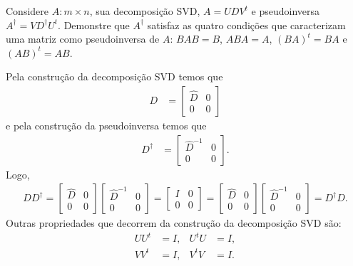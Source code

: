 \documentclass[a4paper,12pt, leqno, answers]{exam}
\begin{document}
\thispagestyle{empty}

\newpage
\setcounter{page}{1}
\begin{questions}
    \question Considere $A : m \times n$, sua decomposi\c{c}\~{a}o SVD, $A = U D V^t$ e pseudoinversa $A^\dagger = V D^\dagger U^t$. Demonstre que $A^\dagger$ satisfaz as quatro condi\c{c}\~{o}es que caracterizam uma matriz como pseudoinversa de $A$: $B A B = B$, $A B A = A$, $(B A)^t = BA$ e $(A B)^t = A B$.
    \begin{solution}
        Pela constru\c{c}\~{a}o da decomposi\c{c}\~{a}o SVD temos que
        \begin{align*}
            D &= \begin{bmatrix}
                \hat{D} & 0 \\
                0 & 0
            \end{bmatrix}
        \end{align*}
        e pela constru\c{c}\~{a}o da pseudoinversa temos que
        \begin{align*}
            D^\dagger &= \begin{bmatrix}
                \hat{D}^{-1} & 0 \\
                0 & 0
            \end{bmatrix}.
        \end{align*}
        Logo,
        \begin{align*}
            D D^\dagger = \begin{bmatrix}
                \hat{D} & 0 \\
                0 & 0
            \end{bmatrix} \begin{bmatrix}
                \hat{D}^{-1} & 0 \\
                0 & 0
            \end{bmatrix} = \begin{bmatrix}
                I & 0 \\
                0 & 0
            \end{bmatrix} = \begin{bmatrix}
                \hat{D} & 0 \\
                0 & 0
            \end{bmatrix} \begin{bmatrix}
                \hat{D}^{-1} & 0 \\
                0 & 0
            \end{bmatrix} = D^\dagger D.
        \end{align*}
        Outras propriedades que decorrem da constru\c{c}\~{a}o da decomposi\c{c}\~{a}o SVD s\~{a}o:
        \begin{align*}
            U U^t &= I, & U^t U &= I, \\
            V V^t &= I, & V^t V &= I.
        \end{align*}


\end{solution}
\end{questions}
\end{document}
